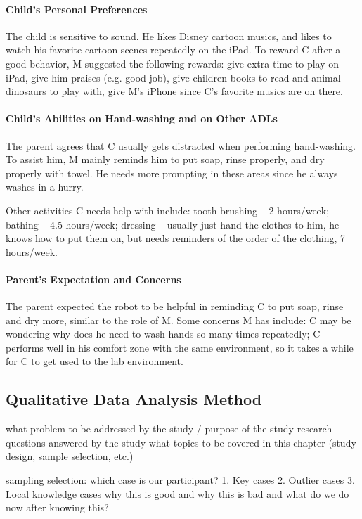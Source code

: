 \paragraph{Child's Personal Preferences}
The child is sensitive to sound.  He likes Disney cartoon musics, and likes to watch his favorite cartoon scenes repeatedly on the iPad.  To reward C after a good behavior, M suggested the following rewards: give extra time to play on iPad, give him praises (e.g. good job), give children books to read and animal dinosaurs to play with, give M's iPhone since C's favorite musics are on there.

\paragraph{Child's Abilities on Hand-washing and on Other ADLs}
The parent agrees that C usually gets distracted when performing hand-washing.  To assist him, M mainly reminds him to put soap, rinse properly, and dry properly with towel.  He needs more prompting in these areas since he always washes in a hurry.

Other activities C needs help with include:  tooth brushing -- 2 hours/week; bathing -- 4.5 hours/week; dressing -- usually just hand the clothes to him, he knows how to put them on, but needs reminders of the order of the clothing, 7 hours/week.

\paragraph{Parent's Expectation and Concerns}
The parent expected the robot to be helpful in reminding C to put soap, rinse and dry more, similar to the role of M.  Some concerns M has include: C may be wondering why does he need to wash hands so many times repeatedly; C performs well in his comfort zone with the same environment, so it takes a while for C to get used to the lab environment.


\subsection{Qualitative Data Analysis Method}

what problem to be addressed by the study / purpose of the study
research questions answered by the study
what topics to be covered in this chapter (study design, sample selection, etc.)

sampling selection:
which case is our participant?
1. Key cases
2. Outlier cases
3. Local knowledge cases
why this is good and why this is bad and what do we do now after knowing this?

